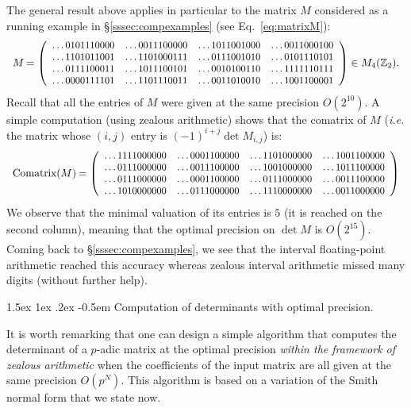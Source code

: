 \documentclass[11pt]{article}
\makeatletter
\numberwithin{equation}{section}
\numberwithin{figure}{section}
\renewcommand\subparagraph{\@startsection{subparagraph}{5}{\z@}%
                                       {1.5ex \@plus1ex \@minus .2ex}%
                                       {-0.5em}%
                                      {\normalfont\normalsize\it}}
\theoremstyle{definition}
\newcommand{\Z}{\mathbb Z}
\newcommand{\Com}{\text{\rm Comatrix}}
\makeatother
\begin{document}
\medskip

The general result above applies in particular to the matrix $M$ 
considered as a running example in \S \ref{sssec:compexamples} (see 
Eq.~\eqref{eq:matrixM}):
\begin{equation}
\label{eq:matrixM2}
\begin{array}{r@{\hspace{0.5ex}}l}
M & = 
\small \left(\begin{array}{rrrr}
\ldots0101110000 & \ldots0011100000 & \ldots1011001000 & \ldots0011000100 \\
\ldots1101011001 & \ldots1101000111 & \ldots0111001010 & \ldots0101110101 \\
\ldots0111100011 & \ldots1011100101 & \ldots0010100110 & \ldots1111110111 \\
\ldots0000111101 & \ldots1101110011 & \ldots0011010010 & \ldots1001100001
\end{array}\right) \in M_4(\Z_2).
\end{array}
\end{equation}
Recall that all the entries of $M$ were given at the same precision
$O(2^{10})$.
A simple computation (using zealous arithmetic) shows that the comatrix 
of $M$ (\emph{i.e.} the matrix whose $(i,j)$ entry is $(-1)^{i+j} \det 
M_{i,j}$) is:
$$\begin{array}{r@{\hspace{0.5ex}}l}
\Com(M) & =
\small \left(\begin{array}{rrrr}
\ldots1111000000 & \ldots0001100000 & \ldots1101000000 & \ldots1001100000 \\
\ldots0111000000 & \ldots0011100000 & \ldots1001000000 & \ldots1011100000 \\
\ldots0111000000 & \ldots0001100000 & \ldots0111000000 & \ldots0011100000 \\
\ldots1010000000 & \ldots0111000000 & \ldots1110000000 & \ldots0011000000
\end{array}\right)
\end{array}$$
We observe that the minimal valuation of its entries is $5$ (it
is reached on the second column), meaning that the optimal precision
on $\det M$ is $O(2^{15})$. Coming back to \S \ref{sssec:compexamples}, 
we see that the interval floating-point arithmetic reached this
accuracy whereas zealous interval arithmetic
missed many digits (without further help).

\subparagraph{Computation of determinants with optimal precision.}

It is worth remarking that one can design a simple algorithm that computes 
the determinant of a $p$-adic matrix at the optimal precision 
\emph{within the framework of zealous arithmetic} when the coefficients 
of the input matrix are all given at the same precision $O(p^N)$. This 
algorithm is based on a variation of the Smith normal form that we state 
now.
\end{document}
